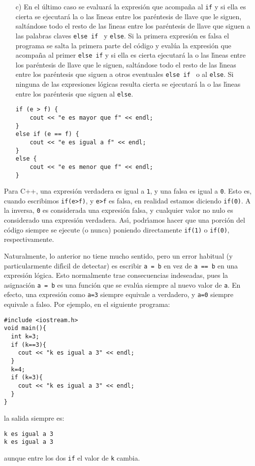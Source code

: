 \begin{enumerate}
\item[c)] En el {\'u}ltimo caso se evaluar{\'a} la expresi{\'o}n que acompa{\~n}a al
  \verb|if| y si ella es cierta se ejecutar{\'a} la o las l{\'\i}neas entre los
  par{\'e}ntesis de llave que le siguen, salt{\'a}ndose todo el resto de las
  l{\'\i}neas entre los par{\'e}ntesis de llave que siguen a las palabras claves
  \verb|else if | y \verb|else|. Si la primera expresi{\'o}n es falsa el
  programa se salta la primera parte del c{\'o}digo y eval{\'u}a la expresi{\'o}n
  que acompa{\~n}a al primer \verb|else if| y si ella es cierta  ejecutar{\'a} la o
  las l{\'\i}neas entre los par{\'e}ntesis de llave que le siguen, salt{\'a}ndose
  todo el resto de las l{\'\i}neas entre los par{\'e}ntesis que siguen a
  otros eventuales \verb|else if | o al \verb|else|. Si ninguna de las
  expresiones l{\'o}gicas resulta cierta se ejecutar{\'a} la o las l{\'\i}neas
  entre los par{\'e}ntesis que siguen al \verb|else|.
\begin{verbatim}
if (e > f) {
    cout << "e es mayor que f" << endl;
} 
else if (e == f) {
    cout << "e es igual a f" << endl;
} 
else {
    cout << "e es menor que f" << endl;
}
\end{verbatim}
\end{enumerate}

Para C++, una expresi\'on verdadera es igual a \verb+1+, y una falsa
es igual a \verb+0+. Esto es, cuando escribimos \verb+if(e>f)+, y
\verb+e>f+ es falsa, en realidad estamos diciendo \verb+if(0)+. 
A la inversa, \verb+0+ es considerada una
expresi\'on falsa, y cualquier valor no nulo es considerado una
expresi\'on verdadera. As\'{\i}, podr\'{\i}amos hacer que una
porci\'on del c\'odigo siempre se ejecute (o nunca) poniendo
directamente \verb+if(1)+ o \verb+if(0)+,
respectivamente. 

Naturalmente, lo anterior  no tiene mucho sentido, pero un error 
habitual  (y particularmente dif\'{\i}cil de
detectar) es escribir
\verb+a = b+ en vez de \verb+a == b+ en
una expresi\'on l\'ogica. Esto normalmente trae consecuencias
indeseadas, pues la asignaci\'on \verb+a = b+ es una funci\'on que se
eval\'ua siempre al nuevo valor de \verb+a+. En efecto, una
expresi\'on como \verb+a=3+ siempre equivale a verdadero, y \verb+a=0+
siempre equivale a falso. Por ejemplo, en el siguiente programa:
\begin{verbatim}
#include <iostream.h>
void main(){
  int k=3;
  if (k==3){
    cout << "k es igual a 3" << endl;
  }
  k=4;
  if (k=3){
    cout << "k es igual a 3" << endl;
  }
}
\end{verbatim}
la salida siempre es:
\begin{verbatim}
k es igual a 3
k es igual a 3
\end{verbatim}
aunque entre los dos \verb+if+ el valor de \verb+k+ cambia.

